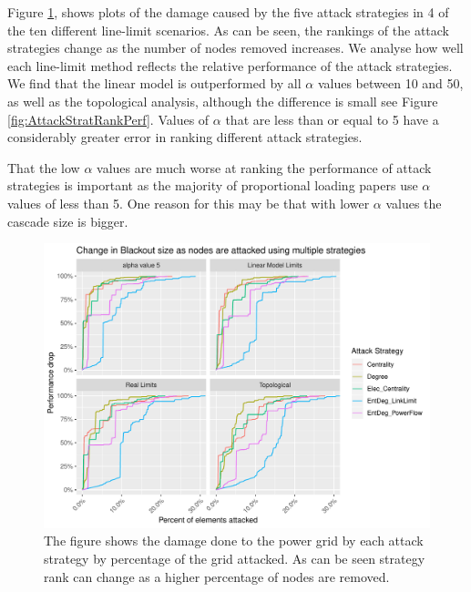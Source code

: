 \documentclass{article}
\begin{document}
Figure \ref{fig:AttackStratDiff}, shows plots of the damage caused by the five attack strategies in 4 of the ten different line-limit scenarios. As can be seen, the rankings of the attack strategies change as the number of nodes removed increases.
We analyse how well each line-limit method reflects the relative performance of the attack strategies. We find that the linear model is outperformed by all $\alpha$ values between 10 and 50, as well as the topological analysis, although the difference is small see Figure \ref{fig:AttackStratRankPerf}. Values of $\alpha$ that are less than or equal to 5 have a considerably greater error in ranking different attack strategies. 

That the low $\alpha$ values are much worse at ranking the performance of attack strategies is important as the majority of proportional loading papers use $\alpha$ values of less than 5. One reason for this may be that with lower $\alpha$ values the cascade size is bigger.

\begin{figure}
    \centering
    \includegraphics{Figures/AttackStratDiff.pdf}
    \caption{The figure shows the damage done to the power grid by each attack strategy by percentage of the grid attacked. As can be seen strategy rank can change as a higher percentage of nodes are removed.}
    \label{fig:AttackStratDiff}
\end{figure}
\end{document}
